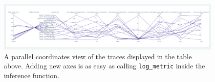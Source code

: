 \begin{figure}
    \centering
    \includegraphics[width=1\textwidth]{figures/greatai-parallel.png}
    \captionsetup{width=.9\linewidth}
    \caption{A parallel coordinates view of the traces displayed in the table above. Adding new axes is as easy as calling \texttt{log\_metric} inside the inference function.}
    \label{fig:greatai-parallel}
\end{figure}
